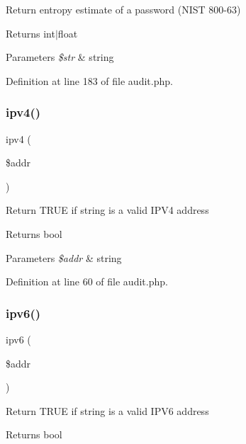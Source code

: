 Return entropy estimate of a password (N\+I\+ST 800-\/63) \begin{DoxyReturn}{Returns}
int$\vert$float 
\end{DoxyReturn}

\begin{DoxyParams}{Parameters}
{\em \$str} & string \\
\hline
\end{DoxyParams}


Definition at line 183 of file audit.\+php.

\hypertarget{class_audit_a2c914582b13324bf624b1cd1763f258e}{}\label{class_audit_a2c914582b13324bf624b1cd1763f258e} 
\subsubsection{\texorpdfstring{ipv4()}{ipv4()}}
{\footnotesize\ttfamily ipv4 (\begin{DoxyParamCaption}\item[{}]{\$addr }\end{DoxyParamCaption})}

Return T\+R\+UE if string is a valid I\+P\+V4 address \begin{DoxyReturn}{Returns}
bool 
\end{DoxyReturn}

\begin{DoxyParams}{Parameters}
{\em \$addr} & string \\
\hline
\end{DoxyParams}


Definition at line 60 of file audit.\+php.

\hypertarget{class_audit_a74a69adbf8a934eee039f323c864a508}{}\label{class_audit_a74a69adbf8a934eee039f323c864a508} 
\subsubsection{\texorpdfstring{ipv6()}{ipv6()}}
{\footnotesize\ttfamily ipv6 (\begin{DoxyParamCaption}\item[{}]{\$addr }\end{DoxyParamCaption})}

Return T\+R\+UE if string is a valid I\+P\+V6 address \begin{DoxyReturn}{Returns}
bool 
\end{DoxyReturn}

